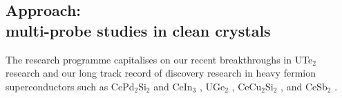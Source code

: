 










\subsection*{Approach: \\ multi-probe studies in clean crystals}
\noindent
The research programme capitalises on our recent breakthroughs in UTe$_2$ research \cite{eaton23,wu23,weinberger23} and our long track record of discovery research in heavy fermion superconductors such as CePd$_2$Si$_2$ and CeIn$_3$ \cite{mathur98}, UGe$_2$ \cite{saxena00}, CeCu$_2$Si$_2$ \cite{yuan02}, and CeSb$_2$ \cite{squire23}. %

